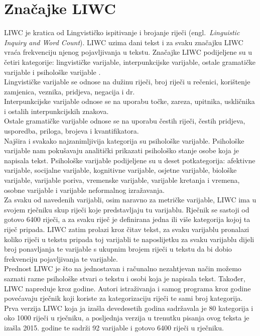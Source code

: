 \documentclass[times,utf8,zavrsni]{fer}
\begin{document}
\newpage
\section{Značajke LIWC}
LIWC je kratica od Lingvističko ispitivanje i brojanje riječi (engl.~\emph{Linguistic Inquiry and Word Count}). LIWC uzima dani tekst i za svaku značajku LIWC vraća frekvenciju njenog pojavljivanja u tekstu. Značajke LIWC podijeljene su u četiri kategorije: lingvističke varijable, interpunkcijske varijable, ostale gramatičke varijable i psihološke varijable \citep{liwc}. \\

Lingvističke varijable se odnose na dužinu riječi, broj riječi u rečenici, korištenje zamjenica, veznika, pridjeva, negacija i dr. \\

Interpunkcijske varijable odnose se na uporabu točke, zareza, upitnika, uskličnika i ostalih interpunkcijskih znakova. \\

Ostale gramatičke varijable odnose se na uporabu čestih riječi, čestih pridjeva, usporedba, priloga, brojeva i kvantifikatora. \\

Najšira i svakako najzanimljivija kategorija su psihološke varijable. Psihološke varijable nam pokušavaju analitički prikazati psihološko stanje osobe koja je napisala tekst. Psihološke varijable podijeljene su u deset potkategorija: afektivne varijable, socijalne varijable, kognitivne varijable, osjetne varijable, biološke varijable, varijable poriva, vremenske varijable, varijable kretanja i vremena, osobne varijable i varijable neformalnog izražavanja. \\


Za svaku od navedenih varijabli, osim naravno za metričke varijable, LIWC ima u svojem rječniku skup riječi koje predstavljaju tu varijablu. Rječnik se sastoji od gotovo 6400 riječi, a za svaku riječ je definirana jedna ili više kategorija kojoj ta riječ pripada. LIWC zatim prolazi kroz čitav tekst, za svaku varijablu pronalazi koliko riječi u tekstu pripada toj varijabli te naposlijetku za svaku varijablu dijeli broj ponavljanja te varijable s ukupnim brojem riječi u tekstu da bi dobio frekvenciju pojavljivanja te varijable. \\


Prednost LIWC je što na jednostavan i računalno nezahtjevan način možemo saznati razne psihološke stvari o tekstu i osobi koja je napisala tekst. Također, LIWC napreduje kroz godine. Autori istraživanja i samog programa kroz godine povećavaju rječnik koji koriste za kategorizaciju riječi te sami broj kategorija. Prva verzija LIWC koja ja izašla devedesetih godina sadržavala je 80 kategorija i oko 1000 riječi u rječniku, a posljednja verzija u trenutku pisanja ovog teksta je izašla 2015. godine te sadrži 92 varijable i gotovo 6400 riječi u rječniku.
\end{document}
